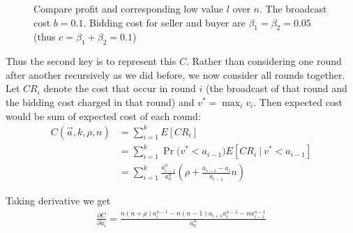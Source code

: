 \begin{figure}
\centering
  \caption{Compare profit and corresponding low value $l$ over $n$. The
  broadcast cost $b = 0.1$. Bidding cost for seller and buyer are $\beta_1 =
  \beta_2 = 0.05$ (thus $c = \beta_1+\beta_2 = 0.1$)}\label{fig:general}
\end{figure}

Thus the second key is to represent this $C$. Rather than
considering one round after another recursively as we did before, we now consider all
rounds together. Let $CR_i$ denote the cost that occur in round $i$ (the broadcast
of that round and the bidding cost charged in that round) and $v^* = \max_i v_i$. Then expected cost
would be sum of expected cost of each round:
\begin{align}
C(\vec a, k, \rho, n) &= \sum_{i=1}^k E[ CR_i ] \nonumber \\
  &= \sum_{i=1}^{k} \Pr\big( v^* < a_{i-1} \big) E[CR_i ~|~ v^* < a_{i-1}] \nonumber \\
  &= \sum_{i=1}^{k} \frac{a_{i-1}^n}{a_0^n} \left( \rho + \frac{a_{i-1}-a_{i}}{a_{i-1}} n \right)
  \label{eq:C_general_simplified}
\end{align}

Taking derivative we get
\begin{align}
 \frac{\partial C}{\partial a_i} = \frac{
	n(n+\rho)a_i^{n-1}-n(n-1)a_{i+1}a_i^{n-2}-n a_{i-1}^{n-1} }{a_0^n}
	\label{eq:diff_C_general}
\end{align}


